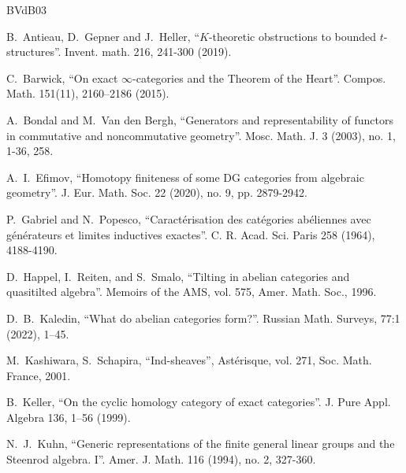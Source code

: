 \documentclass[11pt,leqno]{amsart}
\numberwithin{equation}{section}
\begin{document}
\begin{thebibliography}{BVdB03}


 B.~Antieau, D.~Gepner and J.~Heller, ``$K$-theoretic obstructions to bounded $t$-structures''. Invent. math. 216, 241-300 (2019). 

 C.~Barwick, ``On exact $\infty$-categories and the Theorem of the Heart''. Compos. Math. 151(11), 2160–2186 (2015).


 A.~Bondal and M.~Van den Bergh, ``Generators and representability of functors in commutative and
noncommutative geometry''. Mosc. Math. J. 3 (2003), no. 1, 1-36, 258.

 A.~I.~Efimov, ``Homotopy finiteness of some DG categories from algebraic geometry''. J. Eur. Math. Soc. 22 (2020), no. 9, pp. 2879-2942.


 P.~Gabriel and N.~Popesco, ``Caract\'erisation des cat\'egories ab\'eliennes avec g\'en\'erateurs et
limites inductives exactes''. C. R. Acad. Sci. Paris 258 (1964), 4188-4190.

 D.~Happel, I.~Reiten, and S.~Smalo, ``Tilting in abelian categories and quasitilted algebra''. Memoirs of
the AMS, vol. 575, Amer. Math. Soc., 1996.

 D.~B.~Kaledin, ``What do abelian categories form?''. Russian Math. Surveys, 77:1 (2022), 1–45. 

 M.~Kashiwara, S.~Schapira, ``Ind-sheaves'', Ast\'erisque, vol. 271, Soc. Math. France, 2001.

 B.~Keller, ``On the cyclic homology category of exact categories''. J. Pure Appl. Algebra 136, 1–56 (1999).

 N.~J.~Kuhn, ``Generic representations of the finite general linear groups and the Steenrod algebra. I''. Amer. J. Math. 116 (1994), no. 2, 327-360.


\end{thebibliography}
\end{document}
